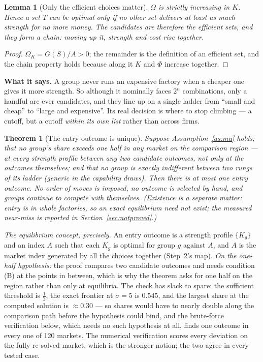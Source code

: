 \documentclass[11pt]{article}
\newcommand{\says}[1]{\smallskip\noindent\textbf{What it says.} #1\smallskip}
\theoremstyle{plain}
\newtheorem{theorem}{Theorem}
\newtheorem{lemma}{Lemma}
\theoremstyle{remark}
\theoremstyle{definition}
\begin{document}
\begin{lemma}[Only the efficient choices matter]\label{lem:frontier}
$\Omega$ is strictly increasing in $K$. Hence a set $T$ can be optimal only if no
other set delivers at least as much strength for no more money. The candidates are
therefore the efficient sets, and they form a \emph{chain}: moving up it, strength and
cost rise together.
\end{lemma}

\begin{proof}
$\Omega_K=G(S)/A>0$; the remainder is the definition of an efficient set, and the
chain property holds because along it $K$ and $\Phi$ increase together.
\end{proof}

\says{A group never runs an expensive factory when a cheaper one gives it more
strength. So although it nominally faces $2^n$ combinations, only a handful are ever
candidates, and they line up on a single ladder from ``small and cheap'' to ``large
and expensive''. Its real decision is where to stop climbing --- a cutoff, but a
cutoff \emph{within its own list} rather than across firms.}

\begin{theorem}[The entry outcome is unique]\label{thm:entry}
Suppose Assumption~\ref{as:mu} holds; that no group's share exceeds one half in any
market \emph{on the comparison region} --- at every strength profile between any two
candidate outcomes, not only at the outcomes themselves; and that no group is exactly
indifferent between two rungs of its ladder (generic in the capability draws). Then
there is \emph{at most one} entry outcome. No order of moves is imposed, no outcome is
selected by hand, and groups continue to compete with themselves. (Existence is a
separate matter: entry is in whole factories, so an exact equilibrium need not exist;
the measured near-miss is reported in Section~\ref{sec:notproved}.)
\end{theorem}

\noindent\emph{The equilibrium concept, precisely.} An entry outcome is a strength
profile $\{K_g\}$ and an index $A$ such that each $K_g$ is optimal for group $g$
against $A$, and $A$ is the market index generated by all the choices together
(Step~2's map). \emph{On the one-half hypothesis:} the proof compares two candidate
outcomes and needs condition (B) at the points in between, which is why the theorem
asks for one half on the region rather than only at equilibria. The check has slack to
spare: the sufficient threshold is $\tfrac12$, the exact frontier at $\sigma=5$ is
$0.545$, and the largest share at the computed solution is $\approx0.30$ --- so shares
would have to nearly double along the comparison path before the hypothesis could
bind, and the brute-force verification below, which needs no such hypothesis at all,
finds one outcome in every one of 120 markets. The numerical verification scores every
deviation on the fully re-solved market, which is the stronger notion; the two agree
in every tested case.
\end{document}

